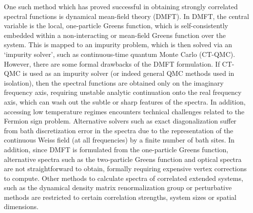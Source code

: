 \documentclass[aps,showpacs,twocolumn,nobibnotes]{revtex4}
\begin{document}
One such method which has proved successful in obtaining strongly correlated spectral functions is dynamical mean-field theory (DMFT)\cite{Georges1992,Georges1996,Kotliar2006}. In 
DMFT, the central variable is the local, one-particle Greens function, which is self-consistently embedded within a non-interacting or 
mean-field Greens function over the system. This is mapped to an impurity problem, which is then solved via an `impurity solver', such as 
continuous-time quantum Monte Carlo (CT-QMC)\cite{Millis2006}. However, there are some formal drawbacks of the DMFT formulation. If CT-QMC is used as an 
impurity solver (or indeed general QMC methods used in isolation), then the spectral functions are obtained only on the imaginary frequency 
axis, requiring unstable analytic continuation onto the real frequency axis, which can wash out the subtle or sharp features of the 
spectra\cite{Thomas2011}. In addition, accessing low temperature regimes encounters technical challenges related to the Fermion sign problem.
Alternative solvers such as exact diagonalization suffer from bath discretization error in the spectra due to the 
representation of the continuous Weiss field (at all frequencies) by a finite number of bath sites. In addition, since DMFT
is formulated from the one-particle Greens function, alternative spectra such as the two-particle Greens function and optical spectra are 
not straightforward to obtain, formally requiring expensive vertex corrections to compute\cite{Millis2012}. Other methods to calculate 
spectra of correlated extended systems, such as the dynamical density matrix renormalization group\cite{Jeckelmann2004} or perturbative
methods\cite{Senechal2000} are restricted to certain correlation strengths, system sizes or spatial dimensions.
\end{document}
